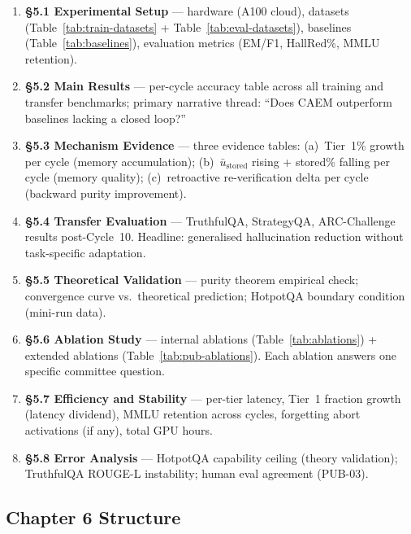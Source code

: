 \documentclass[12pt,a4paper]{article}
\newcommand{\caem}{CAEM}
\begin{document}
\begin{enumerate}
  \item \textbf{\S5.1 Experimental Setup} --- hardware (A100 cloud), datasets
        (Table~\ref{tab:train-datasets} + Table~\ref{tab:eval-datasets}),
        baselines (Table~\ref{tab:baselines}), evaluation metrics (EM/F1,
        HallRed\%, MMLU retention).
  \item \textbf{\S5.2 Main Results} --- per-cycle accuracy table across all
        training and transfer benchmarks; primary narrative thread:
        ``Does \caem{} outperform baselines lacking a closed loop?''
  \item \textbf{\S5.3 Mechanism Evidence} --- three evidence tables:
        (a)~Tier~1\% growth per cycle (memory accumulation);
        (b)~$\bar{u}_{\text{stored}}$ rising + stored\% falling per cycle
        (memory quality); (c)~retroactive re-verification delta per cycle
        (backward purity improvement).
  \item \textbf{\S5.4 Transfer Evaluation} --- TruthfulQA, StrategyQA,
        ARC-Challenge results post-Cycle~10.
        Headline: generalised hallucination reduction without task-specific
        adaptation.
  \item \textbf{\S5.5 Theoretical Validation} --- purity theorem empirical
        check; convergence curve vs.\ theoretical prediction;
        HotpotQA boundary condition (mini-run data).
  \item \textbf{\S5.6 Ablation Study} --- internal ablations
        (Table~\ref{tab:ablations}) + extended ablations
        (Table~\ref{tab:pub-ablations}).
        Each ablation answers one specific committee question.
  \item \textbf{\S5.7 Efficiency and Stability} --- per-tier latency,
        Tier~1 fraction growth (latency dividend), MMLU retention across
        cycles, forgetting abort activations (if any), total GPU hours.
  \item \textbf{\S5.8 Error Analysis} --- HotpotQA capability ceiling
        (theory validation); TruthfulQA ROUGE-L instability; human eval
        agreement (PUB-03).
\end{enumerate}

\subsection{Chapter 6 Structure}
\end{document}
